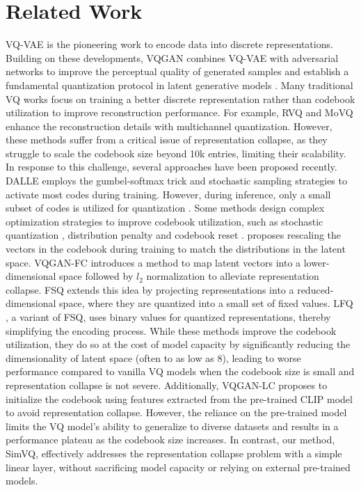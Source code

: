 
\section{Related Work}
VQ-VAE \cite{NIPS2017_7a98af17} is the pioneering work to encode data into discrete representations. Building on these developments, VQGAN \cite{Esser_2021_CVPR} combines VQ-VAE with adversarial networks to improve the perceptual quality of generated samples and establish a fundamental quantization protocol in latent generative models \cite{Rombach_2022_CVPR,yu2022scaling,team2024chameleon}. 
Many traditional VQ works focus on training a better discrete representation rather than codebook utilization to improve reconstruction performance. For example, RVQ \cite{Lee2022AutoregressiveIG} and MoVQ \cite{Zheng2022HighQualityPI} enhance the reconstruction details with multichannel quantization. 
However, these methods suffer from a critical issue of representation collapse, as they struggle to scale the codebook size beyond 10k entries, limiting their scalability. In response to this challenge, several approaches have been proposed recently. 
DALLE \cite{pmlr-v139-ramesh21a} employs the gumbel-softmax trick \cite{DBLP:conf/iclr/JangGP17} and stochastic sampling strategies to activate most codes during training. However, during inference, only a small subset of codes is utilized for quantization \cite{Zhang_2023_CVPR}. 
Some methods design complex optimization strategies to improve codebook utilization, such as stochastic quantization \cite{pmlr-v162-takida22a}, distribution penalty \cite{VQWasserstein,Xiao2023SCVAESC} and codebook reset \cite{zheng2023online}.
\citet{pmlr-v202-huh23a} proposes rescaling the vectors in the codebook during training to match the distributions in the latent space. VQGAN-FC \cite{yu2022vectorquantized} introduces a method to map latent vectors into a lower-dimensional space followed by $l_2$ normalization to alleviate representation collapse. FSQ \cite{mentzer2024finite} extends this idea by projecting representations into a reduced-dimensional space, where they are quantized into a small set of fixed values. LFQ \cite{yu2024language}, a variant of FSQ, uses binary values for quantized representations, thereby simplifying the encoding process. While these methods improve the codebook utilization, they do so at the cost of model capacity by significantly reducing the dimensionality of latent space (often to as low as 8), leading to worse performance compared to vanilla VQ models when the codebook size is small and representation collapse is not severe. Additionally, VQGAN-LC \cite{Zhu2024ScalingTC} proposes to initialize the codebook using features extracted from the pre-trained CLIP model to avoid representation collapse. However, the reliance on the pre-trained model limits the VQ model's ability to generalize to diverse datasets and results in a performance plateau as the codebook size increases. In contrast, our method, SimVQ, effectively addresses the representation collapse problem with a simple linear layer, without sacrificing model capacity or relying on external pre-trained models.


